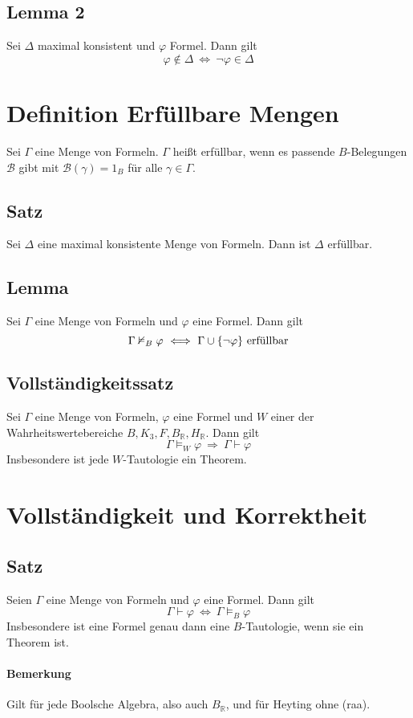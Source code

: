 \documentclass[12pt,a4paper]{report}
\newcommand{\RA}{\Rightarrow}
\newcommand{\real}{\mathbb{R}}
\newcommand{\define}[1]{\section{\blue{Definition #1}}}
\newcommand{\red}[1]{\textcolor[rgb]{0.9,0.2,0.2}{#1}}
\newcommand{\green}[1]{\textcolor[rgb]{0.1,0.6,0.1}{#1}}
\newcommand{\blue}[1]{\textcolor[rgb]{0.2,0.2,1}{#1}}
\begin{document}
\subsection{\green{Lemma 2}}
Sei $ \Delta $ maximal konsistent und $ \varphi $ Formel. Dann gilt
\[
    \varphi \notin \Delta ~\Longleftrightarrow~ \lnot \varphi \in \Delta
\]
\define{Erfüllbare Mengen}
Sei $ \Gamma $ eine Menge von Formeln.\newline
$ \Gamma $ heißt \red{erfüllbar}, wenn es passende $ B $-Belegungen $ \mathcal{B} $ gibt mit $ \mathcal{B}(\gamma) = 1_B $ für alle $ \gamma \in \Gamma $.
\subsection{\green{Satz}}
Sei $ \Delta $ eine maximal konsistente Menge von Formeln. Dann ist $ \Delta $ erfüllbar.
\subsection{\green{Lemma}}
Sei $ \Gamma $ eine Menge von Formeln und $ \varphi $ eine Formel. Dann gilt
\[
    \Gamma \nvDash_B \varphi ~\Longleftrightarrow~ \Gamma \cup \{\lnot \varphi\} \textnormal{ erfüllbar}
\]
\subsection{\green{Vollständigkeitssatz}}
Sei $ \Gamma $ eine Menge von Formeln, $ \varphi $ eine Formel und $ W $ einer der Wahrheitswertebereiche $ B, K_3, F, B_\real, H_\real $. Dann gilt
\[
    \Gamma \vDash_W \varphi ~\RA~ \Gamma \vdash \varphi
\]
Insbesondere ist jede $ W $-Tautologie ein Theorem.

\section{\blue{Vollständigkeit und Korrektheit}}
\subsection{\green{Satz}}
Seien $ \Gamma $ eine Menge von Formeln und $ \varphi $ eine Formel. Dann gilt
\[
    \Gamma \vdash \varphi ~\Leftrightarrow~ \Gamma \vDash_B \varphi
\]
Insbesondere ist eine Formel genau dann eine $ B $-Tautologie, wenn sie ein Theorem ist.
\paragraph{Bemerkung} Gilt für jede Boolsche Algebra, also auch $ B_\real $, und für Heyting ohne (raa).
\end{document}
